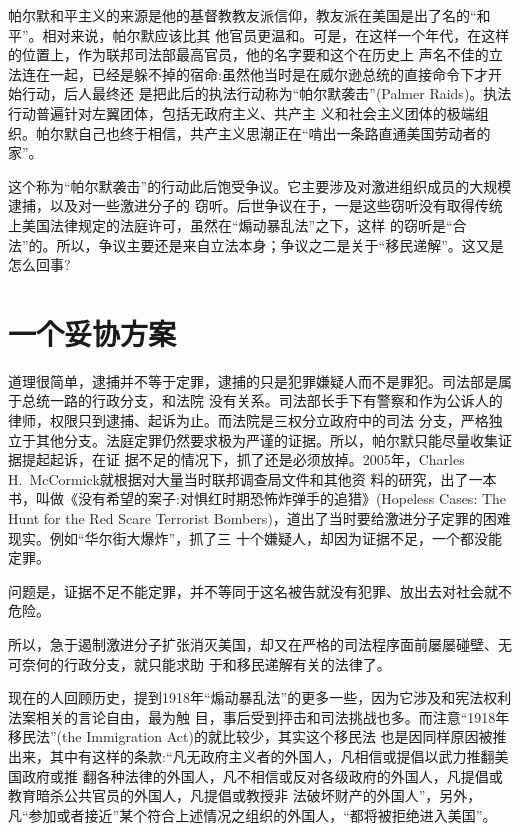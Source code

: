 \documentclass[10pt]{article}
\begin{document}
{帕尔默和平主义的来源是他的基督教教友派信仰，教友派在美国是出了名的``和平''。相对来说，帕尔默应该比其
他官员更温和。可是，在这样一个年代，在这样的位置上，作为联邦司法部最高官员，他的名字要和这个在历史上
声名不佳的立法连在一起，已经是躲不掉的宿命:虽然他当时是在威尔逊总统的直接命令下才开始行动，后人最终还
是把此后的执法行动称为``帕尔默袭击''(Palmer Raids)。执法行动普遍针对左翼团体，包括无政府主义、共产主
义和社会主义团体的极端组织。帕尔默自己也终于相信，共产主义思潮正在``啃出一条路直通美国劳动者的家''。

这个称为``帕尔默袭击''的行动此后饱受争议。它主要涉及对激进组织成员的大规模逮捕，以及对一些激进分子的
窃听。后世争议在于，一是这些窃听没有取得传统上美国法律规定的法庭许可，虽然在``煽动暴乱法''之下，这样
的窃听是``合法''的。所以，争议主要还是来自立法本身；争议之二是关于``移民递解''。这又是怎么回事?

\pagebreak
\section{一个妥协方案}

道理很简单，逮捕并不等于定罪，逮捕的只是犯罪嫌疑人而不是罪犯。司法部是属于总统一路的行政分支，和法院
没有关系。司法部长手下有警察和作为公诉人的律师，权限只到逮捕、起诉为止。而法院是三权分立政府中的司法
分支，严格独立于其他分支。法庭定罪仍然要求极为严谨的证据。所以，帕尔默只能尽量收集证据提起起诉，在证
据不足的情况下，抓了还是必须放掉。2005年，Charles H.~McCormick就根据对大量当时联邦调查局文件和其他资
料的研究，出了一本书，叫做《没有希望的案子:对惧红时期恐怖炸弹手的追猎》(Hopeless Cases: The Hunt for
the Red Scare Terrorist Bombers)，道出了当时要给激进分子定罪的困难现实。例如``华尔街大爆炸''，抓了三
十个嫌疑人，却因为证据不足，一个都没能定罪。

问题是，证据不足不能定罪，并不等同于这名被告就没有犯罪、放出去对社会就不危险。

所以，急于遏制激进分子扩张消灭美国，却又在严格的司法程序面前屡屡碰壁、无可奈何的行政分支，就只能求助
于和移民递解有关的法律了。

现在的人回顾历史，提到1918年``煽动暴乱法''的更多一些，因为它涉及和宪法权利法案相关的言论自由，最为触
目，事后受到抨击和司法挑战也多。而注意``1918年移民法''(the Immigration Act)的就比较少，其实这个移民法
也是因同样原因被推出来，其中有这样的条款:``凡无政府主义者的外国人，凡相信或提倡以武力推翻美国政府或推
翻各种法律的外国人，凡不相信或反对各级政府的外国人，凡提倡或教育暗杀公共官员的外国人，凡提倡或教授非
法破坏财产的外国人''，另外，凡``参加或者接近''某个符合上述情况之组织的外国人，``都将被拒绝进入美国''。

}
\end{document}
